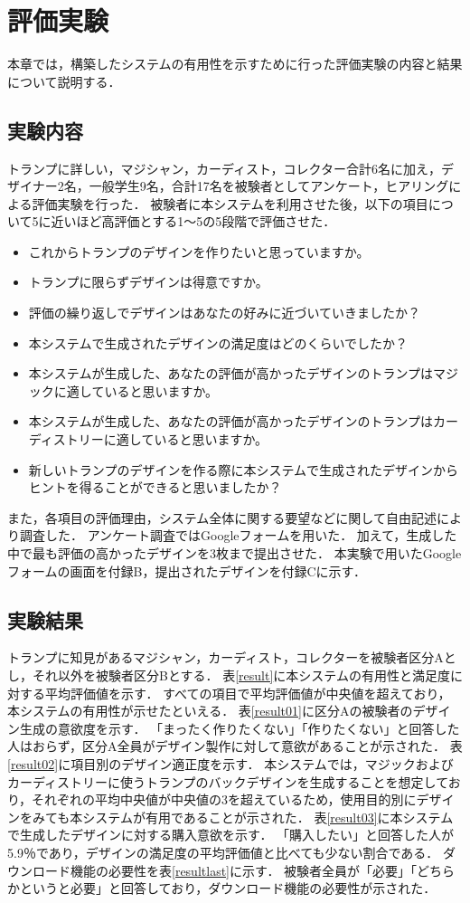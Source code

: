 \chapter{評価実験}
本章では，構築したシステムの有用性を示すために行った評価実験の内容と結果について説明する．

\section{実験内容}
トランプに詳しい，マジシャン，カーディスト，コレクター合計6名に加え，デザイナー2名，一般学生9名，合計17名を被験者としてアンケート，ヒアリングによる評価実験を行った．
被験者に本システムを利用させた後，以下の項目について5に近いほど高評価とする1～5の5段階で評価させた．

\begin{itemize}
    \item これからトランプのデザインを作りたいと思っていますか。
    \item トランプに限らずデザインは得意ですか。
    \item 評価の繰り返しでデザインはあなたの好みに近づいていきましたか？ 
    \item 本システムで生成されたデザインの満足度はどのくらいでしたか？ 
    \item 本システムが生成した、あなたの評価が高かったデザインのトランプはマジックに適していると思いますか。
    \item 本システムが生成した、あなたの評価が高かったデザインのトランプはカーディストリーに適していると思いますか。
    \item 新しいトランプのデザインを作る際に本システムで生成されたデザインからヒントを得ることができると思いましたか？ 
\end{itemize}

また，各項目の評価理由，システム全体に関する要望などに関して自由記述により調査した．
アンケート調査ではGoogleフォームを用いた．
加えて，生成した中で最も評価の高かったデザインを3枚まで提出させた．
本実験で用いたGoogleフォームの画面を付録B，提出されたデザインを付録Cに示す．


\section{実験結果}
トランプに知見があるマジシャン，カーディスト，コレクターを被験者区分Aとし，それ以外を被験者区分Bとする．
表\ref{result}に本システムの有用性と満足度に対する平均評価値を示す．
すべての項目で平均評価値が中央値を超えており，本システムの有用性が示せたといえる．
表\ref{result01}に区分Aの被験者のデザイン生成の意欲度を示す．
「まったく作りたくない」「作りたくない」と回答した人はおらず，区分A全員がデザイン製作に対して意欲があることが示された．
表\ref{result02}に項目別のデザイン適正度を示す．
本システムでは，マジックおよびカーディストリーに使うトランプのバックデザインを生成することを想定しており，それぞれの平均中央値が中央値の3を超えているため，使用目的別にデザインをみても本システムが有用であることが示された．
表\ref{result03}に本システムで生成したデザインに対する購入意欲を示す．
「購入したい」と回答した人が5.9％であり，デザインの満足度の平均評価値と比べても少ない割合である．
ダウンロード機能の必要性を表\ref{resultlast}に示す．
被験者全員が「必要」「どちらかというと必要」と回答しており，ダウンロード機能の必要性が示された．

